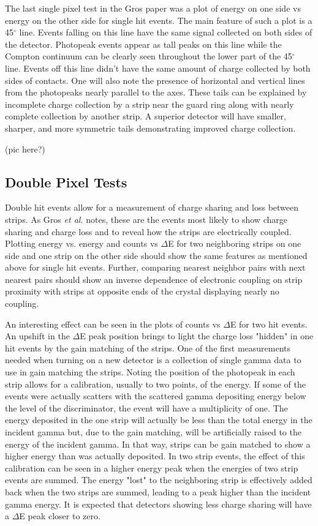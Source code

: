 \indent The last single pixel test in the Gros paper was a plot of energy on one side vs energy on the other side for single hit events. The main feature of such a plot is a 45$^{\circ}$ line. Events falling on this line have the same signal collected on both sides of the detector. Photopeak events appear as tall peaks on this line while the Compton continuum can be clearly seen throughout the lower part of the 45$^{\circ}$ line. Events off this line didn't have the same amount of charge collected by both sides of contacts.  One will also note the presence of horizontal and vertical lines from the photopeaks nearly parallel to the axes. These tails can be explained by incomplete charge collection by a strip near the guard ring along with nearly complete collection by another strip. \cite{SG09} A superior detector will have smaller, sharper, and more symmetric tails demonstrating improved charge collection. \cite{SG09}

(pic here?)

\subsection{Double Pixel Tests}
\indent Double hit events allow for a measurement of charge sharing and loss between strips. As Gros \textit{et al.} notes, these are the events most likely to show charge sharing and charge loss and to reveal how the strips are electrically coupled. Plotting energy vs. energy and counts vs $\Delta$E for two neighboring strips on one side and one strip on the other side should show the same features as mentioned above for single hit events. Further, comparing nearest neighbor pairs with next nearest pairs should show an inverse dependence of electronic coupling on strip proximity with strips at opposite ends of the crystal displaying nearly no coupling. 

\indent An interesting effect can be seen in the plots of counts vs $\Delta$E for two hit events. An upshift in the $\Delta$E peak position brings to light the charge loss "hidden" in one hit events by the gain matching of the strips. One of the first measurements needed when turning on a new detector is a collection of single gamma data to use in gain matching the strips. Noting the position of the photopeak in each strip allows for a calibration, usually to two points, of the energy. If some of the events were actually scatters with the scattered gamma depositing energy below the level of the discriminator, the event will have a multiplicity of one. The energy deposited in the one strip will actually be less than the total energy in the incident gamma but, due to the gain matching, will be artificially raised to the energy of the incident gamma. In that way, strips can be gain matched to show a higher energy than was actually deposited. In two strip events, the effect of this calibration can be seen in a higher energy peak when the energies of two strip events are summed. The energy "lost" to the neighboring strip is effectively added back when the two strips are summed, leading to a peak higher than the incident gamma energy. It is expected that detectors showing less charge sharing will have a $\Delta$E peak closer to zero.


